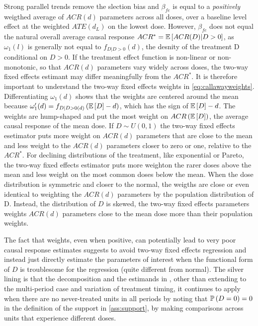 \documentclass[11pt]{article}
\begin{document}
Strong parallel trends remove the slection bias and $\beta_{fe}$ is equal to a \textit{positively} weigthed average of $ACR(d)$ parameters across all doses, over a baseline level effect at the weighted $ATE(d_L)$ on the lowest dose. However, $\beta_{fe}$ does not equal the natural overall average causal response $ACR^{\ast} = \mathbb{E}\left[ ACR(D)|D>0 \right]$, as $\omega_1 (l)$ is generally not equal to $f_{D|D>0} (d)$, the desnity of the treatment D conditional on $D>0$. If the treatment effect function is non-linear or non-monotonic, so that $ACR(d)$ parameters vary widely across doses, the two-way fixed effects estimant may differ meaningfully from the $ACR^{\ast}$. It is therefore important to understand the two-way fixed effects weights in \eqref{eq:callawayweights}. Differentiating $\omega_1 (d)$ shows that the weights are centered around the mean because $\omega^{\prime}_{1} (d) = f_{D|D>0 (d)} \left( \mathbb{E}\left[ D \right] - d \right)$, which has the sign of $\mathbb{E}\left[ D \right] - d$. The weights are hump-shaped and put the most weight on $ACR\left( \mathbb{E}\left[ D \right] \right)$, the average causal response of the mean dose. If $D \sim U(0,1)$ the two-way fixed effects esetimator puts more weight on $ACR(d)$ parameters that are close to the mean and less weight to the $ACR(d)$ parameters closer to zero or one, relative to the $ACR^{\ast}$. For declining distributions of the treatment, like exponential or Pareto, the two-way fixed effects estimator puts more weighton the rarer doses above the mean and less weight on the most common doses below the mean. When the dose distribution is symmetric and closer to the normal, the weigths are close or even identical to weighting the $ACR(d)$ parameters by the population distribution of D. Instead, the distribution of $D$ is skewed, the two-way fixed effects parameters weights $ACR(d)$ parameters close to the mean dose more than their population weights. 

The fact that weights, even when positive, can potentially lead to very poor causal response estimates suggests to avoid two-way fixed effects regression and instead just directly estimate the parameters of interest when the functional form of $D$ is troublesome for the regression (quite different from normal). The silver lining is that the decomposition and the estimands in \citet{bib:callaway2021}, other than extending to the multi-period case and variation of treatment timing, it continues to apply when there are no never-treated units in all periods by noting that $\mathbb{P}\left( D=0 \right) = 0$ in the definition of the support in \ref{ass:support}, by making comparisons across units that experience different doses.
\end{document}
